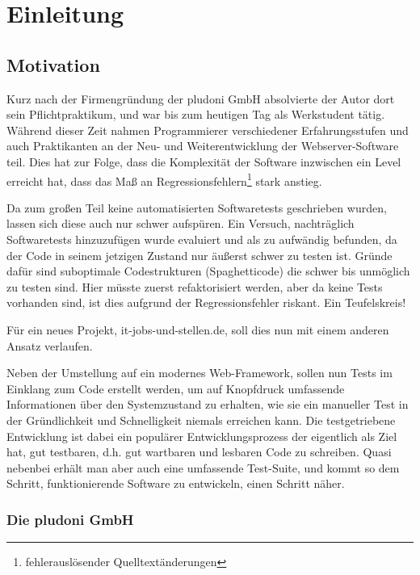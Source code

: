 

\section{Einleitung}
\subsection{Motivation}

Kurz nach der Firmengründung der pludoni GmbH absolvierte der Autor dort sein Pflichtpraktikum, und war bis zum heutigen Tag als Werkstudent tätig.
Während dieser Zeit nahmen Programmierer verschiedener Erfahrungsstufen und auch Praktikanten an der Neu- und Weiterentwicklung der Webserver-Software teil. Dies hat zur Folge, dass die Komplexität der Software inzwischen ein Level erreicht hat, dass das Maß an Regressionsfehlern\footnote{fehlerauslösender Quelltextänderungen} stark anstieg. 

Da zum großen Teil keine automatisierten Softwaretests geschrieben wurden, lassen sich diese auch nur schwer aufspüren. Ein Versuch, nachträglich Softwaretests hinzuzufügen wurde evaluiert und als zu aufwändig befunden, da der Code in seinem jetzigen Zustand nur äußerst schwer zu testen ist. Gründe dafür sind suboptimale Codestrukturen (Spaghetticode) die schwer bis unmöglich zu testen sind. Hier müsste zuerst refaktorisiert werden, aber da keine Tests vorhanden sind, ist dies aufgrund der Regressionsfehler riskant. Ein Teufelskreis!

Für ein neues Projekt, it-jobs-und-stellen.de, soll dies nun mit einem anderen Ansatz verlaufen. 

Neben der Umstellung auf ein modernes Web-Framework, sollen nun Tests im Einklang zum Code erstellt werden, um auf Knopfdruck  umfassende Informationen über den Systemzustand zu erhalten, wie sie ein manueller Test in der Gründlichkeit und Schnelligkeit niemals erreichen kann. Die testgetriebene Entwicklung ist dabei ein populärer Entwicklungsprozess der eigentlich als Ziel hat, gut testbaren, d.h. gut wartbaren und lesbaren Code zu schreiben. Quasi nebenbei erhält man aber auch eine umfassende Test-Suite, und kommt so dem Schritt, funktionierende Software zu entwickeln, einen Schritt näher.

\subsubsection{Die pludoni GmbH}

